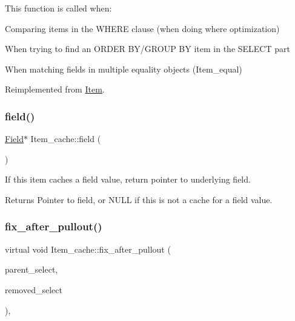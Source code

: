 This function is called when\+:
\begin{DoxyItemize}
\item Comparing items in the W\+H\+E\+RE clause (when doing where optimization)
\item When trying to find an O\+R\+D\+ER B\+Y/\+G\+R\+O\+UP BY item in the S\+E\+L\+E\+CT part
\item When matching fields in multiple equality objects (Item\+\_\+equal) 
\end{DoxyItemize}

Reimplemented from \mbox{\hyperlink{classItem_af0957bbdb9a256de0cd29f1adcae28be}{Item}}.

\mbox{\label{classItem__cache_aec4011e0239387bff54d31814c1d4f43}} 
\subsubsection{\texorpdfstring{field()}{field()}}
{\footnotesize\ttfamily \mbox{\hyperlink{classField}{Field}}$\ast$ Item\+\_\+cache\+::field (\begin{DoxyParamCaption}{ }\end{DoxyParamCaption})\hspace{0.3cm}{\ttfamily [inline]}}

If this item caches a field value, return pointer to underlying field.

\begin{DoxyReturn}{Returns}
Pointer to field, or N\+U\+LL if this is not a cache for a field value. 
\end{DoxyReturn}
\mbox{\label{classItem__cache_a2d1447a09b8702eb448c8176043fe748}} 
\subsubsection{\texorpdfstring{fix\+\_\+after\+\_\+pullout()}{fix\_after\_pullout()}}
{\footnotesize\ttfamily virtual void Item\+\_\+cache\+::fix\+\_\+after\+\_\+pullout (\begin{DoxyParamCaption}\item[{st\+\_\+select\+\_\+lex $\ast$}]{parent\+\_\+select,  }\item[{st\+\_\+select\+\_\+lex $\ast$}]{removed\+\_\+select }\end{DoxyParamCaption})\hspace{0.3cm}{\ttfamily [inline]}, {\ttfamily [virtual]}}

